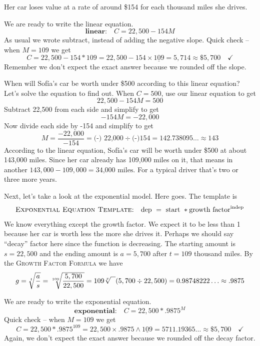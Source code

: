 \noindent
Her car loses value at a rate of around \$154 for each thousand miles she drives.  

We are ready to write the linear equation.  
$$\textbf{linear:} \quad C = 22,500 - 154M$$  
As usual we wrote subtract, instead of adding the negative slope.
Quick check -- when $M=109$ we get $$C =  22,500 - 154\ast 109 =  22,500 - 154\times \underline{109}= 5,714 \approx \$5,700 \quad \checkmark$$
Remember we don't expect the exact answer because we rounded off the slope.  

When will Sof\'{i}a's car be worth under \$500 according to this linear equation?  Let's solve the equation to find out.  When $C=500$, use our linear equation to get  %
$$ 22,500 - 154M =500$$
Subtract 22,500 from each side and simplify to get
$$-154M= -22,000$$
 Now divide each side by -154 and simplify to get
$$M = \frac{-22,000}{-154} = \text{(-) 22,000} \div  \text{(-)}154= 142.738095\ldots \approx 143$$
According to the linear equation, Sof\'{i}a's car will be worth under \$500 at about 143,000 miles.  Since her car already has 109,000 miles on it, that means in another $143,000-109,000 = \text{34,000 miles}$.  For a typical driver that's two or three more years.

Next, let's take a look at the exponential model.  Here goes.  The template is $$\textsc{Exponential Equation Template:} \quad \text{dep }=\text{ start } \ast \text{growth factor}^{\text{indep}}$$
We know everything except the growth factor.   We expect it to be less than 1 because her car is worth less the more she drives it.  Perhaps we should say ``decay'' factor here since the function is decreasing. The starting amount is $s=22,500$ and the ending amount is $a=5,700$ after $t=109$ thousand miles.  By the  \textsc{Growth Factor Formula} we have
$$g = \sqrt[t]{\frac{a}{s}} = \sqrt[109]{\frac{5,700}{22,500}}
= 109  \sqrt[x]{\text{\raisebox{.6em}{~\text{  }}}}( 5,700 \div 22,500)= 0.98748222\ldots \approx .9875$$

We are ready to write the exponential equation.  
$$\textbf{exponential:} \quad C = 22,500 \ast .9875^M$$
Quick check -- when $M=109$ we get $$C =  22,500 \ast .9875^{109} =  22,500 \times .9875 \wedge\underline{109}= 5711.19365\ldots \approx \$5,700 \quad \checkmark$$
Again, we don't expect the exact answer because we rounded off the decay factor.  

